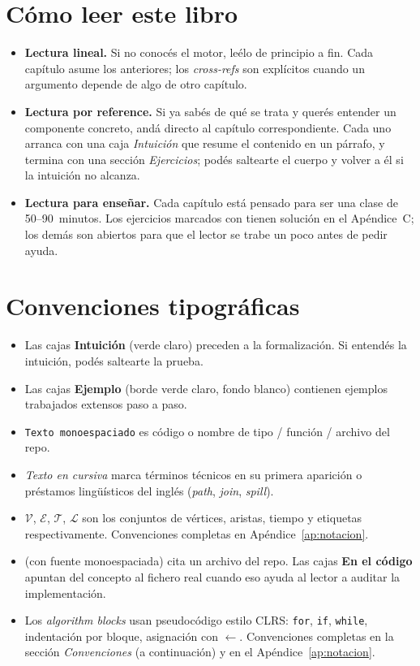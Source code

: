 \section*{Cómo leer este libro}

\begin{itemize}
    \item \textbf{Lectura lineal.} Si no conocés el motor, leélo de
    principio a fin. Cada capítulo asume los anteriores; los
    \emph{cross-refs} son explícitos cuando un argumento depende de
    algo de otro capítulo.
    \item \textbf{Lectura por reference.} Si ya sabés de qué se trata
    y querés entender un componente concreto, andá directo al
    capítulo correspondiente. Cada uno arranca con una caja
    \emph{Intuición} que resume el contenido en un párrafo, y termina
    con una sección \emph{Ejercicios}; podés saltearte el cuerpo y
    volver a él si la intuición no alcanza.
    \item \textbf{Lectura para enseñar.} Cada capítulo está pensado
    para ser una clase de 50--90~minutos. Los ejercicios marcados
    con \starred{} tienen solución en el Apéndice~C; los demás son
    abiertos para que el lector se trabe un poco antes de pedir
    ayuda.
\end{itemize}

\section*{Convenciones tipográficas}

\begin{itemize}
    \item Las cajas \textbf{Intuición} (verde claro) preceden a la
    formalización. Si entendés la intuición, podés saltearte la prueba.
    \item Las cajas \textbf{Ejemplo} (borde verde claro, fondo blanco)
    contienen ejemplos trabajados extensos paso a paso.
    \item \texttt{Texto monoespaciado} es código o nombre de tipo /
    función / archivo del repo.
    \item \emph{Texto en cursiva} marca términos técnicos en su primera
    aparición o préstamos lingüísticos del inglés (\emph{path},
    \emph{join}, \emph{spill}).
    \item \(\mathcal{V}\), \(\mathcal{E}\), \(\mathcal{T}\),
    \(\mathcal{L}\) son los conjuntos de vértices, aristas, tiempo y
    etiquetas respectivamente. Convenciones completas en
    Apéndice~\ref{ap:notacion}.
    \item \texttt{} (con
    fuente monoespaciada) cita un archivo del repo. Las cajas
    \textbf{En el código} apuntan del concepto al fichero real cuando
    eso ayuda al lector a auditar la implementación.
    \item Los \emph{algorithm blocks} usan pseudocódigo estilo CLRS:
    \texttt{for}, \texttt{if}, \texttt{while}, indentación por bloque,
    asignación con \(\leftarrow\). Convenciones completas en la
    sección \emph{Convenciones} (a continuación) y en el
    Apéndice~\ref{ap:notacion}.
\end{itemize}

